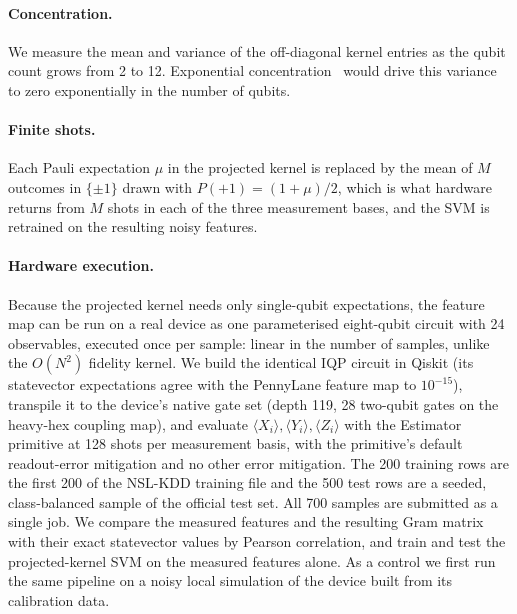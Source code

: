 \documentclass[preprint,11pt]{elsarticle}
\begin{document}
\paragraph{Concentration.} We measure the mean and variance of the off-diagonal kernel entries as the
qubit count grows from 2 to 12. Exponential concentration~\cite{thanasilp2024concentration} would drive
this variance to zero exponentially in the number of qubits.

\paragraph{Finite shots.} Each Pauli expectation $\mu$ in the projected kernel is replaced by the mean of
$M$ outcomes in $\{\pm1\}$ drawn with $P(+1)=(1+\mu)/2$, which is what hardware returns from $M$ shots in
each of the three measurement bases, and the SVM is retrained on the resulting noisy features.

\paragraph{Hardware execution.} Because the projected kernel needs only single-qubit expectations, the
feature map can be run on a real device as one parameterised eight-qubit circuit with 24 observables,
executed once per sample: linear in the number of samples, unlike the $O(N^{2})$ fidelity kernel. We
build the identical IQP circuit in Qiskit (its statevector expectations agree with the PennyLane feature
map to $10^{-15}$), transpile it to the device's native gate set (depth 119, 28 two-qubit gates on the
heavy-hex coupling map), and evaluate $\langle X_i\rangle,\langle Y_i\rangle,\langle Z_i\rangle$ with the
Estimator primitive at 128 shots per measurement basis, with the primitive's default readout-error
mitigation and no other error mitigation. The 200 training rows are the first 200 of the NSL-KDD training
file and the 500 test rows are a seeded, class-balanced sample of the official test set. All 700 samples
are submitted as a single job. We compare the measured features and the resulting Gram matrix with their
exact statevector values by Pearson correlation, and train and test the projected-kernel SVM on the
measured features alone. As a control we first run the same pipeline on a noisy local simulation of the
device built from its calibration data.
\end{document}
